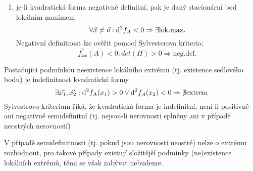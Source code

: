\begin{enumerate}
\begin{enumerate}
\item je-li kvadratická forma negativně definitní, pak je daný stacionární bod lokálním maximem
$$
\forall \vec{x} \neq \vec{o} :
\mathrm{d}^2f_A < 0 
\Rightarrow \exists \mathrm{lok.max.}
$$
Negativní definitnost lze ověřit pomocí Sylvesterova kriteria: 
$$
f^{\prime\prime}_{xx}(A) < 0; det(H) > 0
\Rightarrow \mathrm{neg.def.}
$$

\end{enumerate}
Postačující podmínkou neexistence lokálního extrému (tj. existence sedlového bodu) je indefinitnost kvadratické formy
$$
\exists \vec{x_1},\vec{x_2} :
\mathrm{d}^2f_A(x_1) > 0  \vee \mathrm{d}^2f_A(x_2) < 0 
\Rightarrow \nexists \mathrm{extrem}
$$
Sylvestrovo kriterium říká, že kvadratická forma je indefinitní, není-li positivně ani negativně semidefinitní (tj. nejsou-li nerovnosti splněny ani v případě neostrých nerovností)

V případě semidefinitnosti (tj. pokud jsou nerovnosti neostré) nelze o extrému rozhodnout, pro takové případy existují složitější podmínky (ne)existence lokálních extrémů, těmi se však zabývat nebudeme.

\end{enumerate}